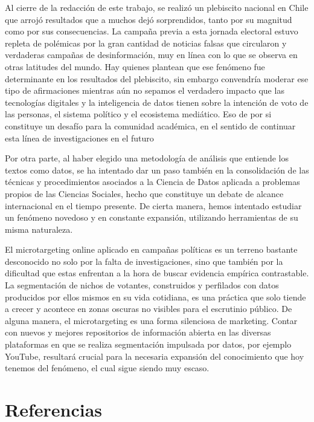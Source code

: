 \documentclass[
  10pt,
  letterpaper,
]{report}
\begin{document}
Al cierre de la redacción de este trabajo, se realizó un plebiscito
nacional en Chile que arrojó resultados que a muchos dejó sorprendidos,
tanto por su magnitud como por sus consecuencias. La campaña previa a
esta jornada electoral estuvo repleta de polémicas por la gran cantidad
de noticias falsas que circularon y verdaderas campañas de
desinformación, muy en línea con lo que se observa en otras latitudes
del mundo. Hay quienes plantean que ese fenómeno fue determinante en los
resultados del plebiscito, sin embargo convendría moderar ese tipo de
afirmaciones mientras aún no sepamos el verdadero impacto que las
tecnologías digitales y la inteligencia de datos tienen sobre la
intención de voto de las personas, el sistema político y el ecosistema
mediático. Eso de por si constituye un desafío para la comunidad
académica, en el sentido de continuar esta línea de investigaciones en
el futuro

Por otra parte, al haber elegido una metodología de análisis que
entiende los textos como datos, se ha intentado dar un paso también en
la consolidación de las técnicas y procedimientos asociados a la Ciencia
de Datos aplicada a problemas propios de las Ciencias Sociales, hecho
que constituye un debate de alcance internacional en el tiempo presente.
De cierta manera, hemos intentado estudiar un fenómeno novedoso y en
constante expansión, utilizando herramientas de su misma naturaleza.

El microtargeting online aplicado en campañas políticas es un terreno
bastante desconocido no solo por la falta de investigaciones, sino que
también por la dificultad que estas enfrentan a la hora de buscar
evidencia empírica contrastable. La segmentación de nichos de votantes,
construidos y perfilados con datos producidos por ellos mismos en su
vida cotidiana, es una práctica que solo tiende a crecer y acontece en
zonas oscuras no visibles para el escrutinio público. De alguna manera,
el microtargeting es una forma silenciosa de marketing. Contar con
nuevos y mejores repositorios de información abierta en las diversas
plataformas en que se realiza segmentación impulsada por datos, por
ejemplo YouTube, resultará crucial para la necesaria expansión del
conocimiento que hoy tenemos del fenómeno, el cual sigue siendo muy
escaso.

\hypertarget{referencias}{%
\chapter{Referencias}\label{referencias}}
\end{document}
